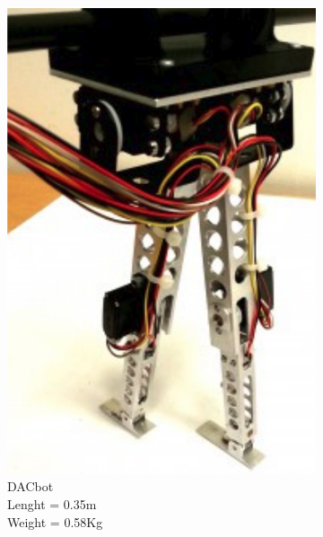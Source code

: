 \begin{figure}[htb]
\centering
  \begin{subfigure}{.22\textwidth}
    \includegraphics[width=0.9\linewidth]{figures/w_dacbot.pdf}
    \caption{DACbot\\
    Lenght = 0.35m\\
    Weight = 0.58Kg}
    \label{fig:w_dacbot}
  \end{subfigure}
  \begin{subfigure}{.22\textwidth}

\end{subfigure}
\end{figure}
